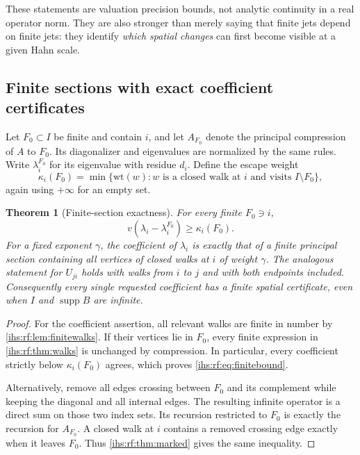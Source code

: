 \documentclass[11pt,a4paper]{article}
\numberwithin{equation}{section}
\newtheorem{theorem}{Theorem}[section]
\theoremstyle{definition}
\theoremstyle{remark}
\newcommand{\supp}{\operatorname{supp}}
\begin{document}
These statements are valuation precision bounds, not analytic continuity in
a real operator norm. They are also stronger than merely saying that finite
jets depend on finite jets: they identify \emph{which spatial changes} can
first become visible at a given Hahn scale.

\subsection{Finite sections with exact coefficient certificates}\label{ihs:rf:sec:finitesec}

Let $F_0\subset I$ be finite and contain $i$, and let $A_{F_0}$ denote the
principal compression of $A$ to $F_0$. Its diagonalizer and eigenvalues are
normalized by the same rules. Write $\lambda_i^{F_0}$ for its eigenvalue
with residue $d_i$. Define the escape weight
\[
 \kappa_i(F_0)=\min\{\mathrm{wt}(w):w\text{ is a closed walk at }i
 \text{ and visits }I\setminus F_0\},
\]
again using $+\infty$ for an empty set.

\begin{theorem}[Finite-section exactness]\label{ihs:rf:thm:finite}
For every finite $F_0\ni i$,
\begin{equation}\label{ihs:rf:eq:finitebound}
 v(\lambda_i-\lambda_i^{F_0})\ge\kappa_i(F_0).
\end{equation}
For a fixed exponent $\gamma$, the coefficient of $\lambda_i$ is exactly
that of a finite principal section containing all vertices of closed walks
at $i$ of weight $\gamma$. The analogous statement for $U_{ji}$ holds with
walks from $i$ to $j$ and with both endpoints included. Consequently every
single requested coefficient has a finite spatial certificate, even when $I$
and $\supp B$ are infinite.
\end{theorem}
\begin{proof}
For the coefficient assertion, all relevant walks are finite in number by
\cref{ihs:rf:lem:finitewalks}. If their vertices lie in $F_0$, every finite
expression in \cref{ihs:rf:thm:walks} is unchanged by compression. In
particular, every coefficient strictly below $\kappa_i(F_0)$ agrees, which
proves \eqref{ihs:rf:eq:finitebound}.

Alternatively, remove all edges crossing between $F_0$ and its complement
while keeping the diagonal and all internal edges. The resulting infinite
operator is a direct sum on those two index sets. Its recursion restricted
to $F_0$ is exactly the recursion for $A_{F_0}$. A closed walk at $i$
contains a removed crossing edge exactly when it leaves $F_0$. Thus
\cref{ihs:rf:thm:marked} gives the same inequality.
\end{proof}
\end{document}
